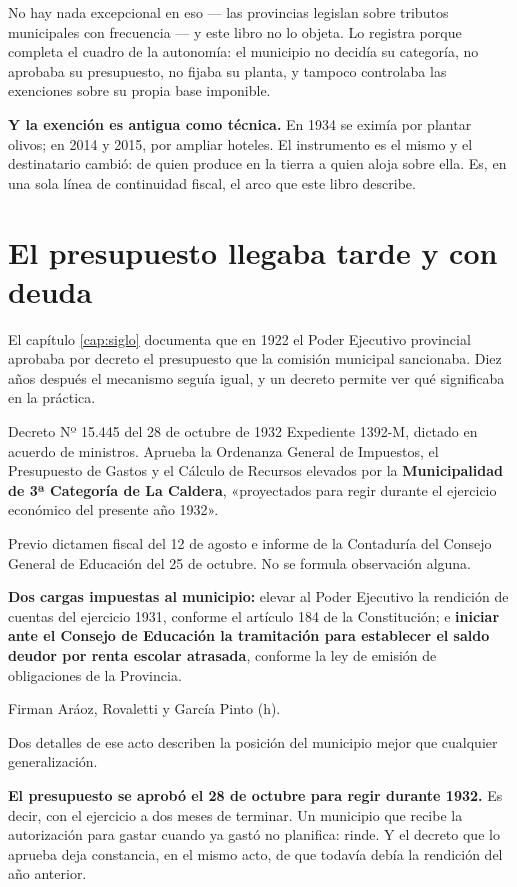No hay nada excepcional en eso --- las provincias legislan sobre tributos municipales con
frecuencia --- y este libro no lo objeta. Lo registra porque completa el cuadro de la
autonomía: el municipio no decidía su categoría, no aprobaba su presupuesto, no fijaba su
planta, y tampoco controlaba las exenciones sobre su propia base imponible.

\textbf{Y la exención es antigua como técnica.} En 1934 se eximía por plantar olivos; en
2014 y 2015, por ampliar hoteles. El instrumento es el mismo y el destinatario cambió: de
quien produce en la tierra a quien aloja sobre ella. Es, en una sola línea de continuidad
fiscal, el arco que este libro describe.

\section{El presupuesto llegaba tarde y con deuda}

El capítulo \ref{cap:siglo} documenta que en 1922 el Poder Ejecutivo provincial aprobaba por decreto el
presupuesto que la comisión municipal sancionaba. Diez años después el mecanismo seguía
igual, y un decreto permite ver qué significaba en la práctica.

\begin{ficha}{Decreto Nº 15.445 del 28 de octubre de 1932}
Expediente 1392-M, dictado en acuerdo de ministros. Aprueba la Ordenanza General de
Impuestos, el Presupuesto de Gastos y el Cálculo de Recursos elevados por la
\textbf{Municipalidad de 3ª Categoría de La Caldera}, «proyectados para regir durante el
ejercicio económico del presente año 1932».

Previo dictamen fiscal del 12 de agosto e informe de la Contaduría del Consejo General de
Educación del 25 de octubre. No se formula observación alguna.

\textbf{Dos cargas impuestas al municipio:} elevar al Poder Ejecutivo la rendición de cuentas
del ejercicio 1931, conforme el artículo 184 de la Constitución; e \textbf{iniciar ante el
Consejo de Educación la tramitación para establecer el saldo deudor por renta escolar
atrasada}, conforme la ley de emisión de obligaciones de la Provincia.

Firman Aráoz, Rovaletti y García Pinto (h).
\end{ficha}

Dos detalles de ese acto describen la posición del municipio mejor que cualquier
generalización.

\textbf{El presupuesto se aprobó el 28 de octubre para regir durante 1932.} Es decir, con el
ejercicio a dos meses de terminar. Un municipio que recibe la autorización para gastar cuando
ya gastó no planifica: rinde. Y el decreto que lo aprueba deja constancia, en el mismo acto,
de que todavía debía la rendición del año anterior.

